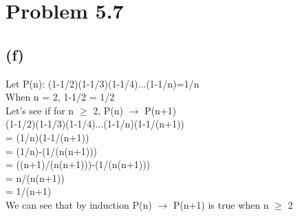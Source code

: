 \documentclass{article}
\begin{document}
\newpage
\section*{Problem 5.7}
\subsection*{(f)}
Let P(n): (1-1/2)(1-1/3)(1-1/4)...(1-1/n)=1/n\\
When n = 2, 1-1/2 = 1/2\\
Let's see if for n $\geq$ 2, P(n) $\rightarrow$ P(n+1)\\
(1-1/2)(1-1/3)(1-1/4)...(1-1/n)(1-1/(n+1))\\
= (1/n)(1-1/(n+1))\\
= (1/n)-(1/(n(n+1)))\\
= ((n+1)/(n(n+1)))-(1/(n(n+1)))\\
= n/(n(n+1))\\
= 1/(n+1)\\
We can see that by induction P(n) $\rightarrow$ P(n+1) is true when n $\geq$ 2\\
\end{document}
